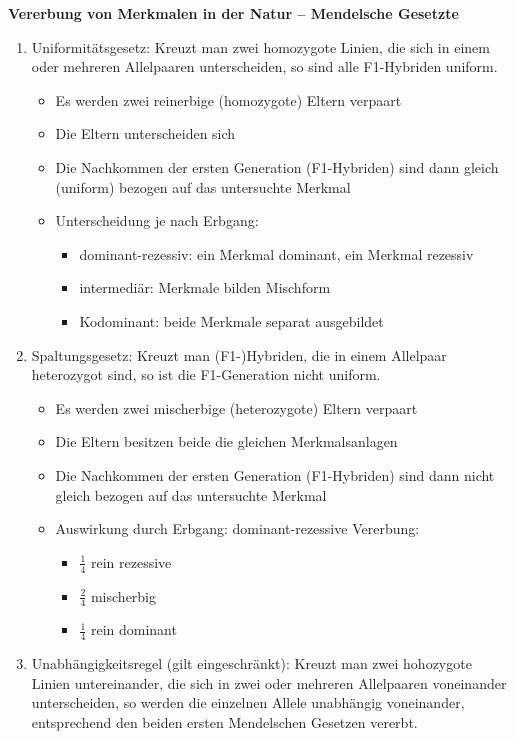 \textbf{Vererbung von Merkmalen in der Natur -- Mendelsche Gesetzte}
\begin{enumerate}
	\item Uniformitätsgesetz:
	Kreuzt man zwei homozygote Linien, die sich in einem oder mehreren Allelpaaren unterscheiden, so sind alle F1-Hybriden uniform.
	\begin{itemize}
		\item Es werden zwei reinerbige (homozygote) Eltern verpaart
		\item Die Eltern unterscheiden sich
		\item Die Nachkommen der ersten Generation (F1-Hybriden) sind dann gleich (uniform) bezogen auf das untersuchte Merkmal
		\item Unterscheidung je nach Erbgang:
		\begin{itemize}
			\item dominant-rezessiv: ein Merkmal dominant, ein Merkmal rezessiv
			\item intermediär: Merkmale bilden Mischform
			\item Kodominant: beide Merkmale separat ausgebildet
		\end{itemize}
	\end{itemize}
	\item Spaltungsgesetz:
	Kreuzt man (F1-)Hybriden, die in einem Allelpaar heterozygot sind, so ist die F1-Generation nicht uniform.
	\begin{itemize}
		\item Es werden zwei mischerbige (heterozygote) Eltern verpaart
		\item Die Eltern besitzen beide die gleichen Merkmalsanlagen
		\item Die Nachkommen der ersten Generation (F1-Hybriden) sind dann nicht gleich bezogen auf das untersuchte Merkmal
		\item Auswirkung durch Erbgang: dominant-rezessive Vererbung:
		\begin{itemize}
			\item $\frac{1}{4}$ rein rezessive
			\item $\frac{2}{4}$ mischerbig
			\item $\frac{1}{4}$ rein dominant
		\end{itemize}
	\end{itemize}
	\item Unabhängigkeitsregel (gilt eingeschränkt):
	Kreuzt man zwei hohozygote Linien untereinander, die sich in zwei oder mehreren Allelpaaren voneinander unterscheiden, so werden die einzelnen Allele unabhängig voneinander, entsprechend den beiden ersten Mendelschen Gesetzen vererbt.
\end{enumerate}

